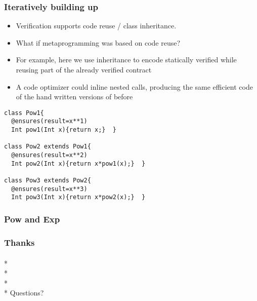 \begin{frame}[fragile]
\frametitle{Iteratively building up \Q@pow@}
\vspace{-2ex}
\begin{itemize}
\item Verification supports code reuse / class inheritance.
\item What if metaprogramming was based on code reuse?
\item For example, here we use inheritance to encode statically verified
\Q@pow@s while reusing part of the already verified contract
\item \tiny{A code optimizer could inline nested calls, producing 
the same efficient code of the hand written versions of before}
\end{itemize}
\vspace{-1ex}
\begin{lstlisting}
class Pow1{
  @ensures(result=x**1)
  Int pow1(Int x){return x;}  }

class Pow2 extends Pow1{
  @ensures(result=x**2)
  Int pow2(Int x){return x*pow1(x);}  }

class Pow3 extends Pow2{
  @ensures(result=x**3)
  Int pow3(Int x){return x*pow2(x);}  }
\end{lstlisting}
\end{frame}


\begin{frame}[fragile]
\frametitle{Pow and Exp}


\end{frame}

\begin{frame}[fragile]
\frametitle{Thanks}
${}_{}$\\*
${}_{}$\\*
${}_{}$\\*
${}_{}$\\*
Questions?
\end{frame}


